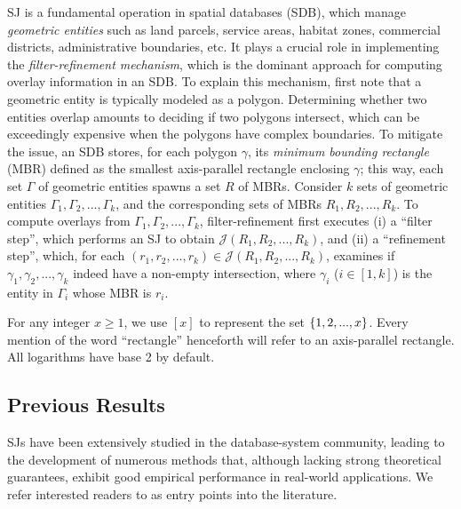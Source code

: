 \documentclass[sigconf]{acmart}
\def\vgap{\vspace{1mm}}
\def\extraspacing{\vspace{2mm} \noindent}
\def\J{\mathcal{J}}
\begin{document}
\vgap

SJ is a fundamental operation in spatial databases (SDB), which manage {\em geometric entities} such as land parcels, service areas, habitat zones, commercial districts, administrative boundaries, etc. It plays a crucial role in implementing the {\em filter-refinement mechanism}, which is the dominant approach for computing overlay information in an SDB. To explain this mechanism, first note that a geometric entity is typically modeled as a polygon. Determining whether two entities overlap amounts to deciding if two polygons intersect, which can be exceedingly expensive when the polygons have complex boundaries. To mitigate the issue, an SDB stores, for each polygon $\gamma$, its {\em minimum bounding rectangle} (MBR) defined as the smallest axis-parallel rectangle enclosing $\gamma$; this way, each set $\Gamma$ of geometric entities spawns a set $R$ of MBRs. Consider $k$ sets of geometric entities $\Gamma_1, \Gamma_2, ..., \Gamma_k$, and the corresponding sets of MBRs $R_1, R_2, ..., R_k$. To compute overlays from $\Gamma_1, \Gamma_2, ..., \Gamma_k$, filter-refinement first executes (i) a ``filter step'', which performs an SJ to obtain $\J(R_1, R_2, ..., R_k)$, and (ii) a ``refinement step'', which, for each $(r_1, r_2, ..., r_k) \in \J(R_1, R_2, ..., R_k)$, examines if $\gamma_1, \gamma_2, ..., \gamma_k$ indeed have a non-empty intersection, where $\gamma_i$ ($i \in [1, k]$) is the entity in $\Gamma_i$ whose MBR is $r_i$.


\extraspacing {\bf Math Conventions.} For any integer $x \ge 1$, we use $[x]$ to represent the set $\{1, 2, ..., x\}$. Every mention of the word ``rectangle'' henceforth will refer to an axis-parallel rectangle. All logarithms have base 2 by default.

\subsection{Previous Results} \label{sec:intro:prev}

SJs have been extensively studied in the database-system community, leading to the development of numerous methods that, although lacking strong theoretical guarantees, exhibit good empirical performance in real-world applications. We refer interested readers to \cite{apr+00,bks93,gcn+13,js07,ks97,lr94,lr96,mp98,mp01,mp03,pd96,pmt99} as entry points into the literature.
\end{document}

